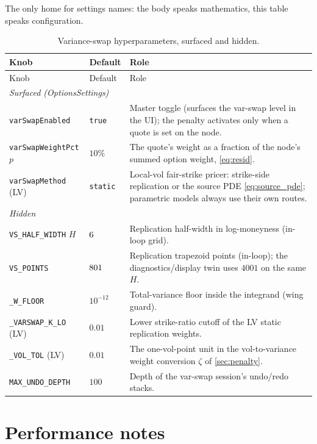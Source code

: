\documentclass[11pt]{article}
\begin{document}
The only home for settings names: the body speaks mathematics, this
table speaks configuration.

\begin{longtable}{p{}p{}p{}}
\caption{Variance-swap hyperparameters, surfaced and hidden.}
\label{tab:atlas}\\
\toprule Knob & Default & Role\\ \midrule
\endfirsthead \toprule Knob & Default & Role\\ \midrule \endhead
\multicolumn{3}{l}{\emph{Surfaced (OptionsSettings)}}\\ \midrule
\texttt{varSwapEnabled} & \texttt{true} & Master toggle (surfaces the
var-swap level in the UI); the penalty activates only when a quote is
set on the node.\\
\texttt{varSwapWeightPct} $p$ & $10\%$ & The quote's weight as a
fraction of the node's summed option weight, \eqref{eq:resid}.\\
\texttt{varSwapMethod} (LV) & \texttt{static} & Local-vol fair-strike
pricer: strike-side replication or the source PDE
\eqref{eq:source_pde}; parametric models always use their own routes.\\
\midrule
\multicolumn{3}{l}{\emph{Hidden}}\\ \midrule
\texttt{VS\_HALF\_WIDTH} $H$ & $6$ & Replication half-width
in log-moneyness (in-loop grid).\\
\texttt{VS\_POINTS} & $801$ & Replication trapezoid points
(in-loop); the diagnostics/display twin uses $4001$ on the same $H$.\\
\texttt{\_W\_FLOOR} & $10^{-12}$ & Total-variance floor inside the
integrand (wing guard).\\
\texttt{\_VARSWAP\_K\_LO} (LV) & $0.01$ & Lower strike-ratio cutoff of
the LV static replication weights.\\
\texttt{\_VOL\_TOL} (LV) & $0.01$ & The one-vol-point unit in the
vol-to-variance weight conversion $\zeta$ of \cref{sec:penalty}.\\
\texttt{MAX\_UNDO\_DEPTH} & $100$ & Depth of the var-swap session's
undo/redo stacks.\\
\bottomrule
\end{longtable}

\section{Performance notes}
\label{app:perf}
\end{document}
